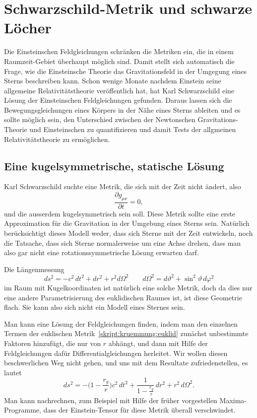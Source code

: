 %
%
%
\chapter{Schwarzschild-Metrik und schwarze Löcher%
\label{skript:chapter:schwarzschild}}
\rhead{}
Die Einsteinschen Feldgleichungen schränken die Metriken ein,
die in einem Raumzeit-Gebiet über\-haupt möglich sind.
Damit stellt sich automatisch die Frage, wie die Einsteinsche Theorie 
das Gravitationsfeld in der Umgegung eines Sterns beschreiben kann.
Schon wenige Monate nachdem Einstein seine allgemeine Relativitätstheorie
veröffentlich hat, hat Karl Schwarzschild eine Lösung der Einsteinschen
Feldgleichungen gefunden.
Daraus lassen sich die Bewegungsgleichungen eines Körpers in der Nähe
eines Sterns ableiten und es sollte möglich sein, den Unterschied zwischen
der Newtonschen Gravitations-Theorie und Einsteinschen  zu quantifizieren
und damit Tests der allgmeinen Relativitätstheorie zu ermöglichen.

\section{Eine kugelsymmetrische, statische Lösung}
Karl Schwarzschild suchte eine Metrik, die sich mit der Zeit nicht ändert,
also
\[
\frac{\partial g_{\mu\nu}}{\partial t}=0,
\]
und die ausserdem kugelsymmetrisch sein soll.
Diese Metrik sollte eine erste Approximation für die Gravitation in
der Umgebung eines Sterns sein.
Natürlich berücksichtigt dieses Modell weder, dass sich Sterne mit
der Zeit entwickeln, noch die Tatsache, dass sich Sterne normalerweise
um eine Achse drehen, dass man also gar nicht eine rotationssymmetrische
Lösung erwarten darf.

Die Längenmessung
\begin{equation}
ds^2
=
-c^2\,dt^2 + dr^2 + r^2 d\Omega^2
\qquad
d\Omega^2 = d\vartheta^2 + \sin^2\vartheta\,d\varphi^2
\label{skript:kruemmung:euklid}
\end{equation}
im Raum mit Kugelkoordinaten ist natürlich eine solche Metrik,
doch da dies nur eine andere Parametrisierung des euklidischen
Raumes ist, ist diese Geometrie flach.
Sie kann also sich nicht ein Modell eines Sternes sein.

Man kann eine Lösung der Feldgleichungen finden, indem man den
einzelnen Termen der euklischen Metrik~\eqref{skript:kruemmung:euklid}
zunächst unbestimmte Faktoren hinzufügt, die nur von $r$ abhängt,
und dann mit Hilfe der Feldgleichungen dafür Differentialgleichungen
herleitet.
Wir wollen diesen beschwerlichen Weg nicht gehen, und uns mit dem
Resultate zufriedenstellen, es lautet
\begin{equation}
ds^2
=
-\biggl(1-\frac{r_g}r\biggr)c^2\,dt^2
+\frac1{\displaystyle 1-\frac{r_g}r}\,dr^2 + r^2\,d\Omega^2.
\label{skript:kruemmung:schwarzschildmetrik}
\end{equation}
Man kann nachrechnen, zum Beispiel mit Hilfe der früher vorgestellen
Maxima-Programme, dass der Einstein-Tensor für diese Metrik überall
verschwindet.

